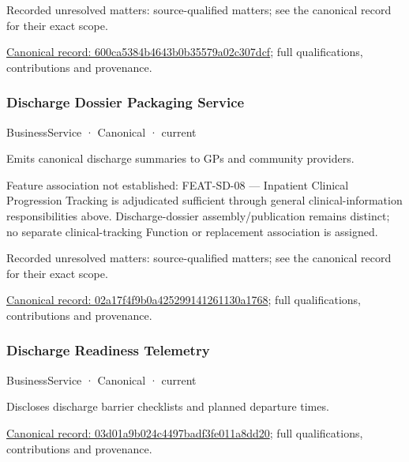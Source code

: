 {\small Recorded unresolved matters: source-qualified matters; see the canonical record for their exact scope.}\par
{\footnotesize \href{../../../../continuum/business/business-service/600ca5384b4643b0b35579a02c307dcf.md}{Canonical record: 600ca5384b4643b0b35579a02c307dcf}; full qualifications, contributions and provenance.}\par
\subsubsection{Discharge Dossier Packaging Service}

\label{element:02a17f4f9b0a425299141261130a1768}
{\small BusinessService · Canonical · current}\par

Emits canonical discharge summaries to GPs and community providers.



Feature association not established: FEAT-SD-08 — Inpatient Clinical Progression Tracking is adjudicated sufficient through general clinical-information responsibilities above. Discharge-dossier assembly/publication remains distinct; no separate clinical-tracking Function or replacement association is assigned.


{\small Recorded unresolved matters: source-qualified matters; see the canonical record for their exact scope.}\par
{\footnotesize \href{../../../../continuum/business/business-service/02a17f4f9b0a425299141261130a1768.md}{Canonical record: 02a17f4f9b0a425299141261130a1768}; full qualifications, contributions and provenance.}\par
\subsubsection{Discharge Readiness Telemetry}

\label{element:03d01a9b024c4497badf3fe011a8dd20}
{\small BusinessService · Canonical · current}\par

Discloses discharge barrier checklists and planned departure times.


{\footnotesize \href{../../../../continuum/business/business-service/03d01a9b024c4497badf3fe011a8dd20.md}{Canonical record: 03d01a9b024c4497badf3fe011a8dd20}; full qualifications, contributions and provenance.}\par
